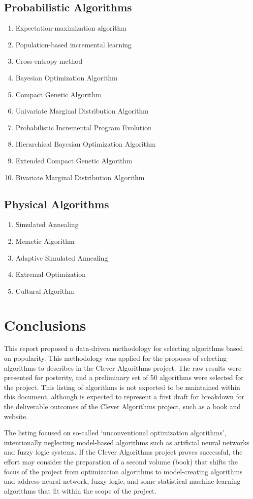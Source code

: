 \documentclass[a4paper, 11pt]{article}
\begin{document}
\subsection{Probabilistic Algorithms}
\begin{enumerate}
	\item Expectation-maximization algorithm
	\item Population-based incremental learning
	\item Cross-entropy method
	\item Bayesian Optimization Algorithm
	\item Compact Genetic Algorithm
	\item Univariate Marginal Distribution Algorithm
	\item Probabilistic Incremental Program Evolution
	\item Hierarchical Bayesian Optimization Algorithm
	\item Extended Compact Genetic Algorithm
	\item Bivariate Marginal Distribution Algorithm
\end{enumerate}

\subsection{Physical Algorithms}
\begin{enumerate}
	\item Simulated Annealing
	\item Memetic Algorithm
	\item Adaptive Simulated Annealing
	\item Extremal Optimization
	\item Cultural Algorithm
\end{enumerate}

% 
% 
\section{Conclusions}
\label{sec:conclusions}
This report proposed a data-driven methodology for selecting algorithms based on popularity. This methodology was applied for the proposes of selecting algorithms to describes in the Clever Algorithms project. The raw results were presented for posterity, and a preliminary set of 50 algorithms were selected for the project. This listing of algorithms is not expected to be maintained within this document, although is expected to represent a first draft for breakdown for the deliverable outcomes of the Clever Algorithms project, such as a book and website. 

The listing focused on so-called `unconventional optimization algorithms', intentionally neglecting model-based algorithms such as artificial neural networks and fuzzy logic systems. If the Clever Algorithms project proves successful, the effort may consider the preparation of a second volume (book) that shifts the focus of the project from optimization algorithms to model-creating algorithms and address neural network, fuzzy logic, and some statistical machine learning algorithms that fit within the scope of the project.



\end{document}
